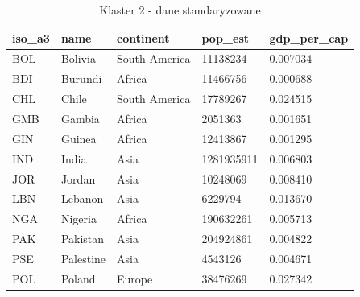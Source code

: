 \documentclass[11pt]{report}
\begin{document}
    \begin{table}[h!]
        \caption {Klaster 2 - dane standaryzowane} \label{tab:cl2std}
        \begin{tabular}{lllll}
            \hline
            \multicolumn{1}{|l|}{iso\_a3} & \multicolumn{1}{l|}{name} & \multicolumn{1}{l|}{continent} & \multicolumn{1}{l|}{pop\_est} & \multicolumn{1}{l|}{gdp\_per\_cap} \\ \hline
            BOL                           & Bolivia                   & South America                  & 11138234                      & 0.007034                           \\
            BDI                           & Burundi                   & Africa                         & 11466756                      & 0.000688                           \\
            CHL                           & Chile                     & South America                  & 17789267                      & 0.024515                           \\
            GMB                           & Gambia                    & Africa                         & 2051363                       & 0.001651                           \\
            GIN                           & Guinea                    & Africa                         & 12413867                      & 0.001295                           \\
            IND                           & India                     & Asia                           & 1281935911                    & 0.006803                           \\
            JOR                           & Jordan                    & Asia                           & 10248069                      & 0.008410                           \\
            LBN                           & Lebanon                   & Asia                           & 6229794                       & 0.013670                           \\
            NGA                           & Nigeria                   & Africa                         & 190632261                     & 0.005713                           \\
            PAK                           & Pakistan                  & Asia                           & 204924861                     & 0.004822                           \\
            PSE                           & Palestine                 & Asia                           & 4543126                       & 0.004671                           \\
            POL                           & Poland                    & Europe                         & 38476269                      & 0.027342
        \end{tabular}
    \end{table}
\end{document}

